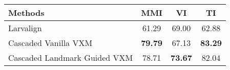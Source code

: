 \begin{adjustbox}{width=0.6\linewidth}
\begin{tabular}{lccc}
\hline
 ﻿Methods  & MMI   & VI    & TI    \\ \hline \hline
 Larvalign & 61.29 & 69.00 & 62.88 \\
 Cascaded Vanilla VXM  & \textbf{79.79}  & 67.13 & \textbf{83.29} \\
 Cascaded Landmark Guided VXM  & 78.71 & \textbf{73.67} & 82.04 \\
\hline
\end{tabular}
\end{adjustbox}
